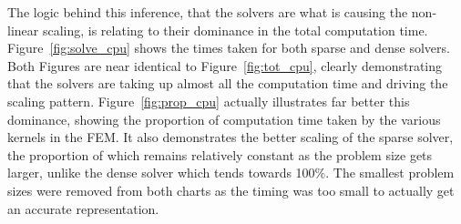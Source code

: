 The logic behind this inference, that the solvers are what is causing the non-linear scaling, is relating to their dominance in the total computation time. Figure~\ref{fig:solve_cpu} shows the times taken for both sparse and dense solvers. Both Figures are near identical to Figure~\ref{fig:tot_cpu}, clearly demonstrating that the solvers are taking up almost all the computation time and driving the scaling pattern. Figure~\ref{fig:prop_cpu} actually illustrates far better this dominance, showing the proportion of computation time taken by the various kernels in the FEM. It also demonstrates the better scaling of the sparse solver, the proportion of which remains relatively constant as the problem size gets larger, unlike the dense solver which tends towards 100\%. The smallest problem sizes were removed from both charts as the timing was too small to actually get an accurate representation.

